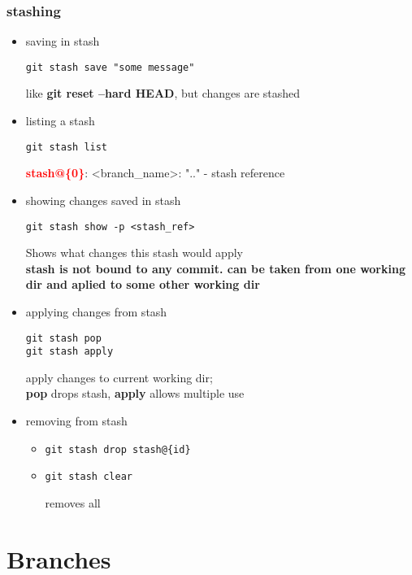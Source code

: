\documentclass{report}
\begin{document}
\section{stashing}
\begin{itemize}
\item saving in stash
\begin{verbatim}
git stash save "some message"
\end{verbatim}
like \textbf{git reset --hard HEAD}, but changes are stashed

\item listing a stash 
\begin{verbatim}
git stash list
\end{verbatim}
\textcolor{red}{\textbf{stash@\{0\}}}: \textless branch\_name\textgreater: ".." - stash reference

\item showing changes saved in stash
\begin{verbatim}
git stash show -p <stash_ref>
\end{verbatim}
Shows what changes this stash would apply\\
\textbf{stash is not bound to any commit. can be taken from one working dir and aplied to some other working dir}

\item applying changes from stash
\begin{verbatim}
git stash pop
git stash apply
\end{verbatim}
apply changes to current working dir;\\
\textbf{pop} drops stash, \textbf{apply} allows multiple use

\item removing from stash
\begin{itemize}
\item \begin{verbatim}
git stash drop stash@{id}
\end{verbatim}

\item \begin{verbatim}
git stash clear
\end{verbatim}
removes all

\end{itemize}
\end{itemize}




\part{Branches}
\end{document}
